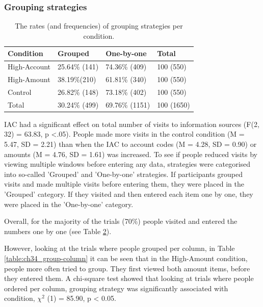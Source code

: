 \begin{table}
\begin{enumerate}
\subsubsection{Grouping strategies}
\begin{table}[!ht]
\centering
\begin{tabular}{|l|l|l|l|}
\hline
Condition    & Grouped       & One-by-one     & Total      \\ \hline
High-Account & 25.64\% {\footnotesize (141)} & 74.36\% {\footnotesize (409)}  & 100 {\footnotesize (550)}  \\ \hline
High-Amount  & 38.19\%{\footnotesize  (210)} & 61.81\% {\footnotesize (340)}  & 100 {\footnotesize (550)}  \\ \hline
Control      & 26.82\% {\footnotesize (148)} & 73.18\% {\footnotesize (402)}  & 100 {\footnotesize (550)}  \\ \hline
Total        & 30.24\% {\footnotesize (499)} & 69.76\% {\footnotesize (1151)} & 100 {\footnotesize (1650)} \\ \hline
\end{tabular}
\caption{The rates (and frequencies) of grouping strategies per condition.}\label{table:ch34_group-total}
\end{table}

IAC had a significant effect on total number of visits to information sources  (F(2, 32) = 63.83, p <.05). People made more visits in the control condition (M = 5.47, SD = 2.21) than when the IAC to account codes (M = 4.28, SD = 0.90) or amounts (M = 4.76, SD = 1.61) was increased. To see if people reduced visits by viewing multiple windows before entering any data, strategies were categorised into so-called 'Grouped' and 'One-by-one' strategies. If participants grouped visits and made multiple visits before entering them, they were placed in the 'Grouped' category. If they visited and then entered each item one by one, they were placed in the 'One-by-one' category.

Overall, for the majority of the trials (70\%) people visited and entered the numbers one by one (see Table \ref{table:ch34_group-total}).

However, looking at the trials where people grouped per column, in Table \ref{table:ch34_group-column} it can be seen that in the High-Amount condition, people more often tried to group. They first viewed both amount items, before they entered them. A chi-square test showed that looking at trials where people ordered per column, grouping strategy was significantly associated with condition, $\chi^2$ (1) = 85.90, p < 0.05. 


\end{enumerate}
\end{table}
